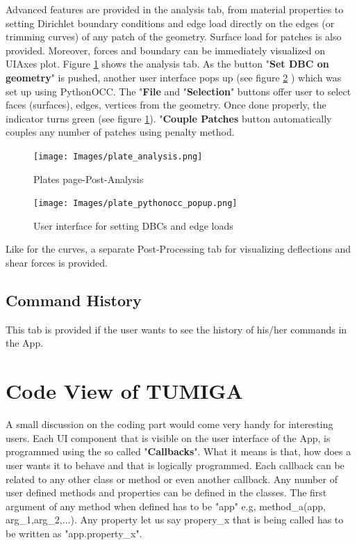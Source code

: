 \documentclass[12pt, a4paper]{report}
\begin{document}
Advanced features are provided in the analysis tab, from material properties to setting Dirichlet boundary conditions and edge load directly on the edges (or trimming curves) of any patch of the geometry. Surface load for patches is also provided. Moreover, forces and boundary can be immediately visualized on UIAxes plot. Figure \ref{fig:plate_analysis} shows the analysis tab. As the button "\textbf{Set DBC on geometry}" is pushed, another user interface pops up (see figure \ref{fig:plate_pythonocc_popup} ) which was set up using PythonOCC. The "\textbf{File} and "\textbf{Selection}" buttons offer user to select faces (surfaces), edges, vertices from the geometry. Once done properly, the indicator turns green (see figure \ref{fig:plate_analysis}). "\textbf{Couple Patches} button automatically couples any number of patches using penalty method. 
\begin{figure}[H]
\centering
\texttt{[image: Images/plate\_analysis.png]}
\caption{Plates page-Post-Analysis}
\label{fig:plate_analysis}
\end{figure}

\begin{figure}[H]
\centering
\texttt{[image: Images/plate\_pythonocc\_popup.png]}
\caption{User interface for setting DBCs and edge loads}
\label{fig:plate_pythonocc_popup}
\end{figure}
Like for the curves, a separate Post-Processing tab  for visualizing deflections and shear forces is provided.

\subsection{Command History}
This tab is provided if the user wants to see the history of his/her commands in the App. 

\section{Code View of TUMIGA}
A small discussion on the coding part would come very handy for interesting users. Each UI component that is visible on the user interface of the App, is programmed using the so called "\textbf{Callbacks}". What it means is that, how does a user wants it to behave and that is logically programmed. Each callback can be related to any other class or method or even another callback. Any number of user defined methods and properties can be defined in the classes. The first argument of any method when defined has to be "app" e.g, method\_a(app, arg\_1,arg\_2,...). Any property let us say propery\_x that is being called has to be written as "app.property\_x".
\end{document}
